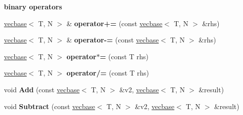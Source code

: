 \begin{Indent}{\bf binary operators}\par
{\em \label{_amgrp04c8a55c25fdc9a3444da113de31256d}
 }\begin{DoxyCompactItemize}
\item 
\hypertarget{classmath_1_1vecbase_aacfba6fee34bc6dfd105d955f675c74e}{
\hyperlink{classmath_1_1vecbase}{vecbase}$<$ T, N $>$ \& {\bfseries operator+=} (const \hyperlink{classmath_1_1vecbase}{vecbase}$<$ T, N $>$ \&rhs)}
\label{classmath_1_1vecbase_aacfba6fee34bc6dfd105d955f675c74e}

\item 
\hypertarget{classmath_1_1vecbase_a874c46c228e890efcbaa703b3a86b8f7}{
\hyperlink{classmath_1_1vecbase}{vecbase}$<$ T, N $>$ \& {\bfseries operator-\/=} (const \hyperlink{classmath_1_1vecbase}{vecbase}$<$ T, N $>$ \&rhs)}
\label{classmath_1_1vecbase_a874c46c228e890efcbaa703b3a86b8f7}

\item 
\hypertarget{classmath_1_1vecbase_abd3625bf7668ae19cd1e3c46ed155c74}{
\hyperlink{classmath_1_1vecbase}{vecbase}$<$ T, N $>$ {\bfseries operator$\ast$=} (const T rhs)}
\label{classmath_1_1vecbase_abd3625bf7668ae19cd1e3c46ed155c74}

\item 
\hypertarget{classmath_1_1vecbase_a792a888a68713a1a63fe6af0149ce11c}{
\hyperlink{classmath_1_1vecbase}{vecbase}$<$ T, N $>$ {\bfseries operator/=} (const T rhs)}
\label{classmath_1_1vecbase_a792a888a68713a1a63fe6af0149ce11c}

\item 
\hypertarget{classmath_1_1vecbase_aedb460222d2c0cbf6a9221df060fbea5}{
void {\bfseries Add} (const \hyperlink{classmath_1_1vecbase}{vecbase}$<$ T, N $>$ \&v2, \hyperlink{classmath_1_1vecbase}{vecbase}$<$ T, N $>$ \&result)}
\label{classmath_1_1vecbase_aedb460222d2c0cbf6a9221df060fbea5}

\item 
\hypertarget{classmath_1_1vecbase_a8dd9dcfbea3f70b15b7171afd8fde3b9}{
void {\bfseries Subtract} (const \hyperlink{classmath_1_1vecbase}{vecbase}$<$ T, N $>$ \&v2, \hyperlink{classmath_1_1vecbase}{vecbase}$<$ T, N $>$ \&result)}
\label{classmath_1_1vecbase_a8dd9dcfbea3f70b15b7171afd8fde3b9}

\end{DoxyCompactItemize}
\end{Indent}
